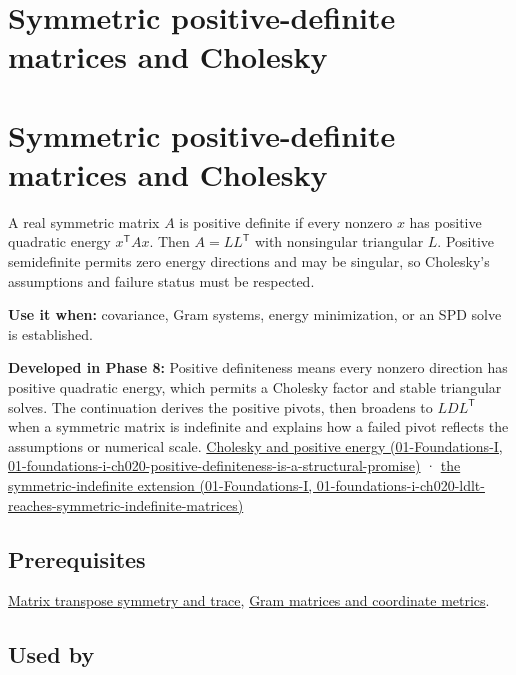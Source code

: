 \hypertarget{appendix-50d2ea3c9b26}{}
\section*{Symmetric positive-definite matrices and Cholesky}
\section{Symmetric positive-definite matrices and Cholesky}\label{appendix-50d2ea3c9b26-symmetric-positive-definite-matrices-and-cholesky}

A real symmetric matrix \(A\) is positive definite if every nonzero \(x\) has positive quadratic energy \(x^\mathsf T A x\). Then \(A=LL^\mathsf T\) with nonsingular triangular \(L\). Positive semidefinite permits zero energy directions and may be singular, so Cholesky's assumptions and failure status must be respected.

\textbf{Use it when:} covariance, Gram systems, energy minimization, or an SPD solve is established.

\textbf{Developed in Phase 8:} Positive definiteness means every nonzero direction has positive quadratic energy, which permits a Cholesky factor and stable triangular solves. The continuation derives the positive pivots, then broadens to \(LDL^\mathsf T\) when a symmetric matrix is indefinite and explains how a failed pivot reflects the assumptions or numerical scale. \href{../01-Foundations-I/main.pdf\#nameddest=01-foundations-i-ch020-positive-definiteness-is-a-structural-promise}{Cholesky and positive energy (01-Foundations-I, 01-foundations-i-ch020-positive-definiteness-is-a-structural-promise)} · \href{../01-Foundations-I/main.pdf\#nameddest=01-foundations-i-ch020-ldlt-reaches-symmetric-indefinite-matrices}{the symmetric-indefinite extension (01-Foundations-I, 01-foundations-i-ch020-ldlt-reaches-symmetric-indefinite-matrices)}

\subsection{Prerequisites}\label{appendix-50d2ea3c9b26-prerequisites}

\hyperref[appendix-175ca5ff874d]{Matrix transpose symmetry and trace}, \hyperref[appendix-3b863809f82a]{Gram matrices and coordinate metrics}.

\subsection{Used by}\label{appendix-50d2ea3c9b26-used-by}

